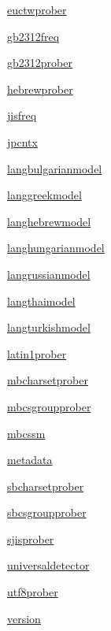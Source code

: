 \begin{DoxyCompactItemize}
 \hyperlink{namespacepip_1_1__vendor_1_1chardet_1_1euctwprober}{euctwprober}
\item 
 \hyperlink{namespacepip_1_1__vendor_1_1chardet_1_1gb2312freq}{gb2312freq}
\item 
 \hyperlink{namespacepip_1_1__vendor_1_1chardet_1_1gb2312prober}{gb2312prober}
\item 
 \hyperlink{namespacepip_1_1__vendor_1_1chardet_1_1hebrewprober}{hebrewprober}
\item 
 \hyperlink{namespacepip_1_1__vendor_1_1chardet_1_1jisfreq}{jisfreq}
\item 
 \hyperlink{namespacepip_1_1__vendor_1_1chardet_1_1jpcntx}{jpcntx}
\item 
 \hyperlink{namespacepip_1_1__vendor_1_1chardet_1_1langbulgarianmodel}{langbulgarianmodel}
\item 
 \hyperlink{namespacepip_1_1__vendor_1_1chardet_1_1langgreekmodel}{langgreekmodel}
\item 
 \hyperlink{namespacepip_1_1__vendor_1_1chardet_1_1langhebrewmodel}{langhebrewmodel}
\item 
 \hyperlink{namespacepip_1_1__vendor_1_1chardet_1_1langhungarianmodel}{langhungarianmodel}
\item 
 \hyperlink{namespacepip_1_1__vendor_1_1chardet_1_1langrussianmodel}{langrussianmodel}
\item 
 \hyperlink{namespacepip_1_1__vendor_1_1chardet_1_1langthaimodel}{langthaimodel}
\item 
 \hyperlink{namespacepip_1_1__vendor_1_1chardet_1_1langturkishmodel}{langturkishmodel}
\item 
 \hyperlink{namespacepip_1_1__vendor_1_1chardet_1_1latin1prober}{latin1prober}
\item 
 \hyperlink{namespacepip_1_1__vendor_1_1chardet_1_1mbcharsetprober}{mbcharsetprober}
\item 
 \hyperlink{namespacepip_1_1__vendor_1_1chardet_1_1mbcsgroupprober}{mbcsgroupprober}
\item 
 \hyperlink{namespacepip_1_1__vendor_1_1chardet_1_1mbcssm}{mbcssm}
\item 
 \hyperlink{namespacepip_1_1__vendor_1_1chardet_1_1metadata}{metadata}
\item 
 \hyperlink{namespacepip_1_1__vendor_1_1chardet_1_1sbcharsetprober}{sbcharsetprober}
\item 
 \hyperlink{namespacepip_1_1__vendor_1_1chardet_1_1sbcsgroupprober}{sbcsgroupprober}
\item 
 \hyperlink{namespacepip_1_1__vendor_1_1chardet_1_1sjisprober}{sjisprober}
\item 
 \hyperlink{namespacepip_1_1__vendor_1_1chardet_1_1universaldetector}{universaldetector}
\item 
 \hyperlink{namespacepip_1_1__vendor_1_1chardet_1_1utf8prober}{utf8prober}
\item 
 \hyperlink{namespacepip_1_1__vendor_1_1chardet_1_1version}{version}
\end{DoxyCompactItemize}

